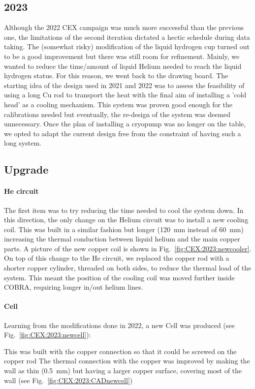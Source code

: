 \begin{refsection}
\section{2023}
    Although the 2022 CEX campaign was much more successful than the previous one, the limitations of the second iteration dictated a hectic schedule during data taking. 
    The (somewhat risky) modification of the liquid hydrogen cup turned out to be a good improvement but there was still room for refinement. 
    Mainly, we wanted to reduce the time/amount of liquid Helium needed to reach the liquid hydrogen status. 
    For this reason, we went back to the drawing board.
    The starting idea of the design used in 2021 and 2022 was to assess the feasibility of using a long Cu rod to transport the heat with the final aim of installing a 'cold head' as a cooling mechanism.
    This system was proven good enough for the calibrations needed but eventually, the re-design of the system was deemed unnecessary.
    Once the plan of installing a cryopump was no longer on the table, we opted to adapt the current design free from the constraint of having such a long system. 

    \subsection{Upgrade}
        \paragraph{He circuit}
        The first item was to try reducing the time needed to cool the system down.
        In this direction, the only change on the Helium circuit was to install a new cooling coil.
        This was built in a similar fashion but longer (\SI{120}{mm} instead of \SI{60}{mm}) increasing the thermal conduction between liquid helium and the main copper parts.
        A picture of the new copper coil is shown in Fig.~\ref{fig:CEX:2023:newcooler}.
        On top of this change to the He circuit, we replaced the copper rod with a shorter copper cylinder, threaded on both sides, to reduce the thermal load of the system.
        This meant the position of the cooling coil was moved further inside COBRA, requiring longer in/out helium lines. 
        
        \paragraph{Cell} Learning from the modifications done in 2022, a new Cell was produced (see Fig.~\ref{fig:CEX:2023:newcell}):
        \begin{outline}
            \1 This was built with the copper connection so that it could be screwed on the copper rod
            \1 The thermal connection with the copper was improved by making the wall as thin (\SI{0.5}{mm}) but  having a larger copper surface, covering most of the wall (see Fig.~\ref{fig:CEX:2023:CADnewcell})
        \end{outline}
        

\end{refsection}
